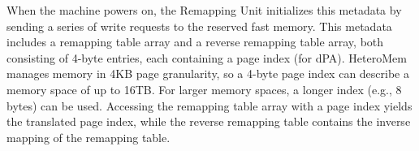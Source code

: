 When the machine powers on, the Remapping Unit initializes this metadata by sending a series of write requests to the reserved fast memory.
This metadata includes a remapping table array and a reverse remapping table array, both consisting of 4-byte entries, each containing a page index (for dPA). 
HeteroMem manages memory in 4KB page granularity, so a 4-byte page index can describe a memory space of up to 16TB. For larger memory spaces, a longer index (e.g., 8 bytes) can be used.
Accessing the remapping table array with a page index yields the translated page index, while the reverse remapping table contains the inverse mapping of the remapping table.


